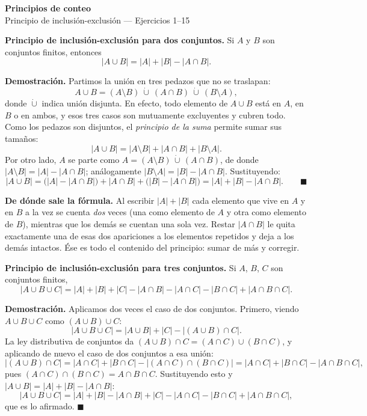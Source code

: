 \documentclass[11pt]{article}
\begin{document}
\begin{center}{\LARGE\bfseries Principios de conteo}\\[2pt]{\large Principio de inclusión-exclusión --- Ejercicios 1--15}\end{center}

\vspace{4pt}

\begin{teo}
\textbf{Principio de inclusión-exclusión para dos conjuntos.} Si $A$ y $B$ son conjuntos finitos, entonces
\[
|A\cup B| = |A| + |B| - |A\cap B| .
\]

\smallskip
\textbf{Demostración.} Partimos la unión en tres pedazos que no se traslapan:
\[
A\cup B = (A\setminus B)\ \dot\cup\ (A\cap B)\ \dot\cup\ (B\setminus A),
\]
donde $\dot\cup$ indica unión disjunta. En efecto, todo elemento de $A\cup B$ está en $A$, en $B$ o en ambos, y esos tres casos son mutuamente excluyentes y cubren todo. Como los pedazos son disjuntos, el \emph{principio de la suma} permite sumar sus tamaños:
\[
|A\cup B| = |A\setminus B| + |A\cap B| + |B\setminus A| .
\]
Por otro lado, $A$ se parte como $A=(A\setminus B)\,\dot\cup\,(A\cap B)$, de donde $|A\setminus B| = |A|-|A\cap B|$; análogamente $|B\setminus A| = |B|-|A\cap B|$. Sustituyendo:
\[
|A\cup B| = \bigl(|A|-|A\cap B|\bigr) + |A\cap B| + \bigl(|B|-|A\cap B|\bigr) = |A|+|B|-|A\cap B| . \qquad \blacksquare
\]

\smallskip
\textbf{De dónde sale la fórmula.} Al escribir $|A|+|B|$ cada elemento que vive en $A$ y en $B$ a la vez se cuenta \emph{dos} veces (una como elemento de $A$ y otra como elemento de $B$), mientras que los demás se cuentan una sola vez. Restar $|A\cap B|$ le quita exactamente una de esas dos apariciones a los elementos repetidos y deja a los demás intactos. Ése es todo el contenido del principio: sumar de más y corregir.

\smallskip
\textbf{Principio de inclusión-exclusión para tres conjuntos.} Si $A$, $B$, $C$ son conjuntos finitos,
\[
|A\cup B\cup C| = |A|+|B|+|C| - |A\cap B| - |A\cap C| - |B\cap C| + |A\cap B\cap C| .
\]

\smallskip
\textbf{Demostración.} Aplicamos dos veces el caso de dos conjuntos. Primero, viendo $A\cup B\cup C$ como $(A\cup B)\cup C$:
\[
|A\cup B\cup C| = |A\cup B| + |C| - |(A\cup B)\cap C| .
\]
La ley distributiva de conjuntos da $(A\cup B)\cap C = (A\cap C)\cup(B\cap C)$, y aplicando de nuevo el caso de dos conjuntos a esa unión:
\[
|(A\cup B)\cap C| = |A\cap C| + |B\cap C| - |(A\cap C)\cap(B\cap C)| = |A\cap C|+|B\cap C|-|A\cap B\cap C| ,
\]
pues $(A\cap C)\cap(B\cap C) = A\cap B\cap C$. Sustituyendo esto y $|A\cup B|=|A|+|B|-|A\cap B|$:
\[
|A\cup B\cup C| = |A|+|B|-|A\cap B| + |C| - |A\cap C| - |B\cap C| + |A\cap B\cap C| ,
\]
que es lo afirmado. $\blacksquare$


\end{teo}
\end{document}
